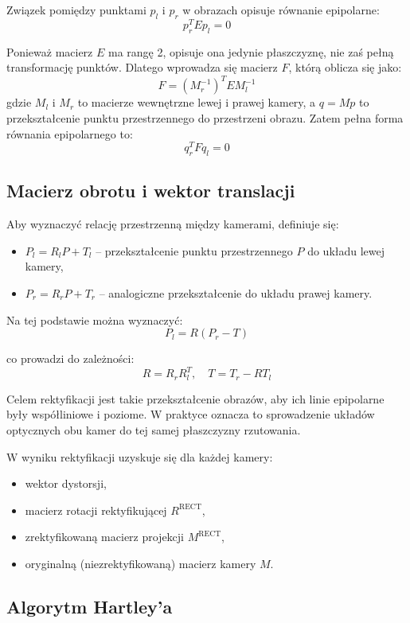 \documentclass[magisterska]{pracadypl}
\begin{document}
Związek pomiędzy punktami $p_l$ i $p_r$ w obrazach opisuje równanie epipolarne:
\[
p_r^T E p_l = 0
\]

Ponieważ macierz $E$ ma rangę 2, opisuje ona jedynie płaszczyznę, nie zaś pełną transformację punktów. Dlatego wprowadza się macierz $F$, którą oblicza się jako:
\[
F = (M_r^{-1})^T E M_l^{-1}
\]
gdzie $M_l$ i $M_r$ to macierze wewnętrzne lewej i prawej kamery, a $q = M p$ to przekształcenie punktu przestrzennego do przestrzeni obrazu. Zatem pełna forma równania epipolarnego to:
\[
q_r^T F q_l = 0
\]

\subsection{Macierz obrotu i wektor translacji}

Aby wyznaczyć relację przestrzenną między kamerami, definiuje się:

\begin{itemize}
    \item $P_l = R_l P + T_l$ – przekształcenie punktu przestrzennego $P$ do układu lewej kamery,
    \item $P_r = R_r P + T_r$ – analogiczne przekształcenie do układu prawej kamery.
\end{itemize}

Na tej podstawie można wyznaczyć:
\[
P_l = R(P_r - T)
\]

co prowadzi do zależności:
\[
R = R_r R_l^T, \quad T = T_r - R T_l
\]

Celem rektyfikacji jest takie przekształcenie obrazów, aby ich linie epipolarne były współliniowe i poziome. W praktyce oznacza to sprowadzenie układów optycznych obu kamer do tej samej płaszczyzny rzutowania.

W wyniku rektyfikacji uzyskuje się dla każdej kamery:

\begin{itemize}
    \item wektor dystorsji,
    \item macierz rotacji rektyfikującej $R^{\text{RECT}}$,
    \item zrektyfikowaną macierz projekcji $M^{\text{RECT}}$,
    \item oryginalną (niezrektyfikowaną) macierz kamery $M$.
\end{itemize}

\subsection{Algorytm Hartley’a}
\end{document}
